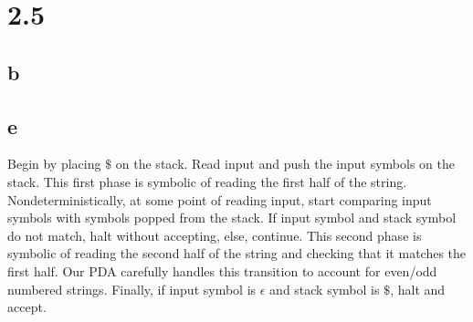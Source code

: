\documentclass{article}
\begin{document}
\section*{2.5}

\subsection*{b}

\subsection*{e}


Begin by placing $\$$ on the stack. Read input and push the input symbols on the stack. This first phase is symbolic of reading the first half of the string. Nondeterministically, at some point of reading input, start comparing input symbols with symbols popped from the stack. If input symbol and stack symbol do not match, halt without accepting, else, continue. This second phase is symbolic of reading the second half of the string and checking that it matches the first half. Our PDA carefully handles this transition to account for even/odd numbered strings. Finally, if input symbol is $\epsilon$ and stack symbol is $\$$, halt and accept. 
\end{document}
